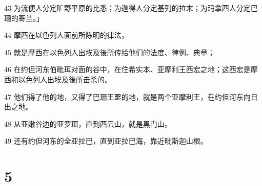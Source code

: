 \par 43 为流便人分定旷野平原的比悉；为迦得人分定基列的拉末；为玛拿西人分定巴珊的哥兰。」
\par 44 摩西在以色列人面前所陈明的律法，
\par 45 就是摩西在以色列人出埃及後所传给他们的法度、律例、典章；
\par 46 在约但河东伯毗珥对面的谷中，在住希实本、亚摩利王西宏之地；这西宏是摩西和以色列人出埃及後所击杀的。
\par 47 他们得了他的地，又得了巴珊王噩的地，就是两个亚摩利王，在约但河东向日出之地。
\par 48 从亚嫩谷边的亚罗珥，直到西云山，就是黑门山。
\par 49 还有约但河东的全亚拉巴，直到亚拉巴海，靠近毗斯迦山根。

\chapter{5}


